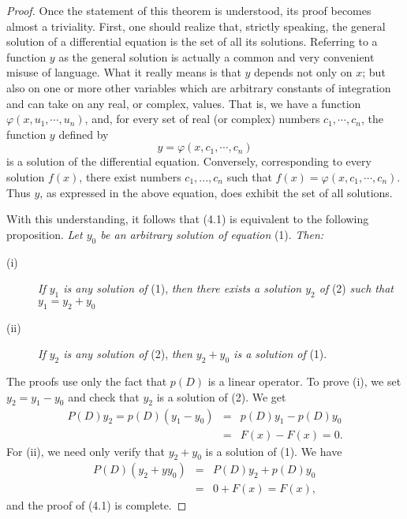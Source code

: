 \begin{proof}
Once the statement of this theorem is understood, its proof becomes almost a triviality. First, one should realize that, strictly speaking, the general solution of a differential equation is the set of all its solutions. Referring to a function $y$ as the general solution is actually a common and very convenient misuse of language. What it really means is that $y$ depends not only on $x$; but also on one or more other variables which are arbitrary constants of integration and can take on any real, or complex, values. That is, we have a function $\varphi(x, u_1, \cdots, u_n)$, and, for every set of real (or complex) numbers $c_1, \cdots , c_n$, the function $y$ defined by
$$
y = \varphi(x, c_1, \cdots , c_n) 
$$
is a solution of the differential equation. Conversely, corresponding to
every solution $f(x)$, there exist numbers $c_1, . . ., c_n$ such that $f(x) = \varphi(x, c_1, \cdots , c_n)$.
Thus $y$, as expressed in the above equation, does exhibit the set of all solutions.

With this understanding, it follows that (4.1) is equivalent to the following proposition. \textit{Let $y_0$ be an arbitrary solution of equation} (1). \textit{Then:}

\begin{description}
\item[(i)] \textit{If $y_1$ is any solution of} \textrm{(1)}, \textit{then there exists a solution $y_2$ of} \textrm{(2)} \textit{such that $y_1 = y_2 + y_0$} 
\smallskip

\item[(ii)] \textit{If $y_2$ is any solution of} \textrm{(2)}, \textit{then $y_2 + y_0$ is a solution of} \textrm{(1)}.
\end{description}

The proofs use only the fact that $p(D)$ is a linear operator. To prove (i), we set $y_2 = y_1 - y_0$ and check that $y_2$ is a solution of (2). We get
\begin{eqnarray*}
P(D)y_2 = p(D)(y_1 - y_0) &=& p(D)y_1 - p(D)y_0 \\
                                           &=& F(x) - F(x) = 0. 
\end{eqnarray*}
For (ii), we need only verify that $y_2 + y_0$ is a solution of (1). We have
\begin{eqnarray*}
P(D)(y_2 + yy_0) &=& P(D)y_2 + p(D)y_0 \\
                            &=& 0 + F(x) = F(x), 
\end{eqnarray*}
and the proof of (4.1) is complete.
\end{proof}

